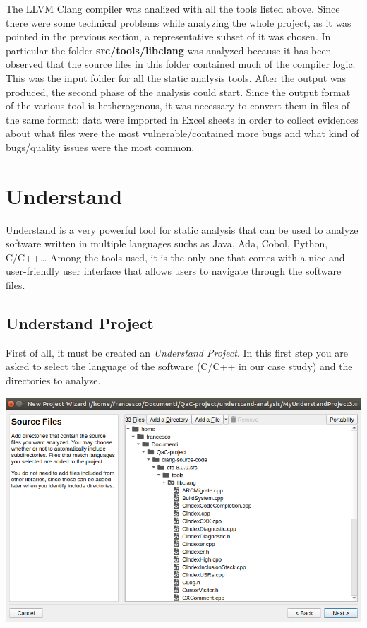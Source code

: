 The LLVM Clang compiler was analized with all the tools listed above.\newline
Since there were some technical problems while analyzing the whole project, as it was pointed in the previous section, a representative subset of it was chosen. In particular the folder \textbf{src/tools/libclang} was analyzed because it has been observed that the source files in this folder contained much of the compiler logic. This was the input folder for all the static analysis tools.\newline\newline
After the output was produced, the second phase of the analysis could start. Since the output format of the various tool is hetherogenous, it was necessary to convert them in files of the same format: data were imported in Excel sheets in order to collect evidences about what files were the most vulnerable/contained more bugs and what kind of bugs/quality issues were the most common.

\section{Understand}

Understand is a very powerful tool for static analysis that can be used to analyze software written in multiple languages suchs as Java, Ada, Cobol, Python, C/C++\dots
Among the tools used, it is the only one that comes with a nice and user-friendly user interface that allows users to navigate through the software files.

\subsection{Understand Project}

First of all, it must be created an \textsl{Understand Project}. In this first step you are asked to select the language of the software (C/C++ in our case study) and the directories to analyze.\newline\newline
\vspace{1cm}
\begin{minipage}{\linewidth}
	\includegraphics[width=\textwidth]{img/libclangDirectory.png}
\end{minipage}

